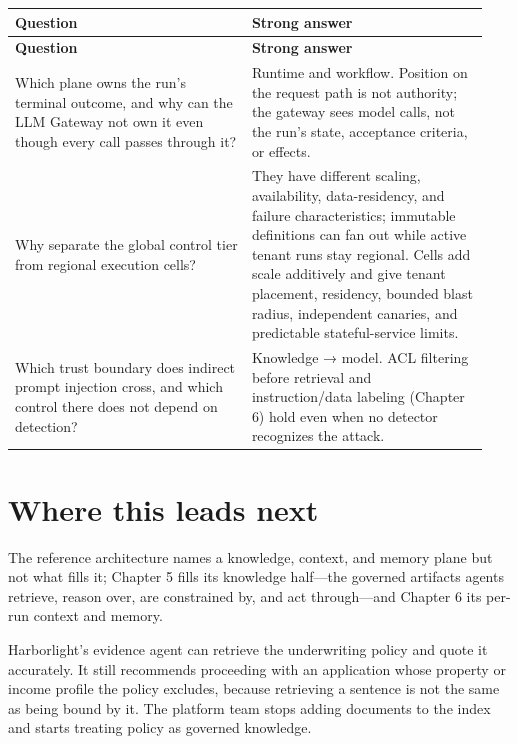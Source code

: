 \BookTableStart
\small
\begin{longtable}{@{}Y{0.4700\linewidth}Y{0.4700\linewidth}@{}}
\color{white}\bfseries \textbf{Question} & \color{white}\bfseries \textbf{Strong answer} \\
\endfirsthead
{}
\color{white}\bfseries \textbf{Question} & \color{white}\bfseries \textbf{Strong answer} \\
\endhead
Which plane owns the run's terminal outcome, and why can the LLM Gateway not own it even though every call passes through it? & Runtime and workflow. Position on the request path is not authority; the gateway sees model calls, not the run's state, acceptance criteria, or effects. \\
Why separate the global control tier from regional execution cells? & They have different scaling, availability, data-residency, and failure characteristics; immutable definitions can fan out while active tenant runs stay regional. Cells add scale additively and give tenant placement, residency, bounded blast radius, independent canaries, and predictable stateful-service limits. \\
Which trust boundary does indirect prompt injection cross, and which control there does not depend on detection? & Knowledge → model. ACL filtering before retrieval and instruction/data labeling (Chapter 6) hold even when no detector recognizes the attack. \\
\end{longtable}
\BookTableEnd

\section{Where this leads next}

The reference architecture names a knowledge, context, and memory plane but not what fills it; Chapter 5 fills its knowledge half—the governed artifacts agents retrieve, reason over, are constrained by, and act through—and Chapter 6 its per-run context and memory.\par



\begin{bookcallout}
Harborlight's evidence agent can retrieve the underwriting policy and quote it accurately. It still recommends proceeding with an application whose property or income profile the policy excludes, because retrieving a sentence is not the same as being bound by it. The platform team stops adding documents to the index and starts treating policy as governed knowledge.
\end{bookcallout}

